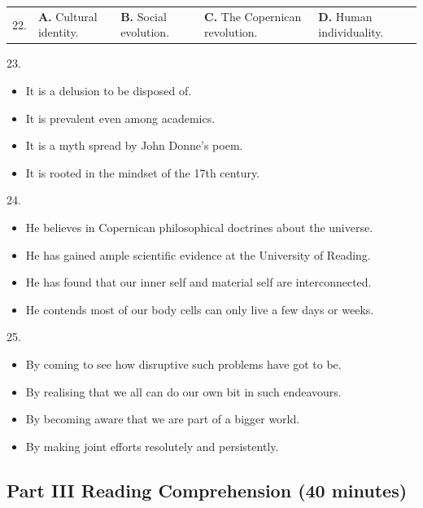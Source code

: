 \documentclass[UTF8,11pt]{ctexart}
\begin{document}
\noindent\begin{tabularx}{\linewidth}{@{}lXXXX@{}}22. & \textbf{A.} Cultural identity. & \textbf{B.} Social evolution. & \textbf{C.} The Copernican revolution. & \textbf{D.} Human individuality.\\\end{tabularx}\par

23.


\begin{itemize}[leftmargin=2em,itemsep=.2em,topsep=.4em]\item[A.] It is a delusion to be disposed of.
\item[B.] It is prevalent even among academics.
\item[C.] It is a myth spread by John Donne’s poem.
\item[D.] It is rooted in the mindset of the 17th century.
\end{itemize}

24.


\begin{itemize}[leftmargin=2em,itemsep=.2em,topsep=.4em]\item[A.] He believes in Copernican philosophical doctrines about the universe.
\item[B.] He has gained ample scientific evidence at the University of Reading.
\item[C.] He has found that our inner self and material self are interconnected.
\item[D.] He contends most of our body cells can only live a few days or weeks.
\end{itemize}

25.


\begin{itemize}[leftmargin=2em,itemsep=.2em,topsep=.4em]\item[A.] By coming to see how disruptive such problems have got to be.
\item[B.] By realising that we all can do our own bit in such endeavours.
\item[C.] By becoming aware that we are part of a bigger world.
\item[D.] By making joint efforts resolutely and persistently.
\end{itemize}

\subsection*{\textbf{Part III Reading Comprehension (40 minutes)}}
\end{document}
